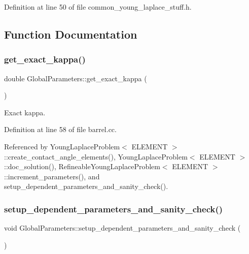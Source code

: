 Definition at line 50 of file common\+\_\+young\+\_\+laplace\+\_\+stuff.\+h.



\subsection{Function Documentation}
\mbox{\label{namespaceGlobalParameters_a4571d41514b16946dd31d075d44c5593}} 
\subsubsection{\texorpdfstring{get\+\_\+exact\+\_\+kappa()}{get\_exact\_kappa()}}
{\footnotesize\ttfamily double Global\+Parameters\+::get\+\_\+exact\+\_\+kappa (\begin{DoxyParamCaption}{ }\end{DoxyParamCaption})}



Exact kappa. 



Definition at line 58 of file barrel.\+cc.



Referenced by Young\+Laplace\+Problem$<$ E\+L\+E\+M\+E\+N\+T $>$\+::create\+\_\+contact\+\_\+angle\+\_\+elements(), Young\+Laplace\+Problem$<$ E\+L\+E\+M\+E\+N\+T $>$\+::doc\+\_\+solution(), Refineable\+Young\+Laplace\+Problem$<$ E\+L\+E\+M\+E\+N\+T $>$\+::increment\+\_\+parameters(), and setup\+\_\+dependent\+\_\+parameters\+\_\+and\+\_\+sanity\+\_\+check().

\mbox{\label{namespaceGlobalParameters_aedbc21f2c81d445634badfc5cdd77436}} 
\subsubsection{\texorpdfstring{setup\+\_\+dependent\+\_\+parameters\+\_\+and\+\_\+sanity\+\_\+check()}{setup\_dependent\_parameters\_and\_sanity\_check()}}
{\footnotesize\ttfamily void Global\+Parameters\+::setup\+\_\+dependent\+\_\+parameters\+\_\+and\+\_\+sanity\+\_\+check (\begin{DoxyParamCaption}{ }\end{DoxyParamCaption})}



